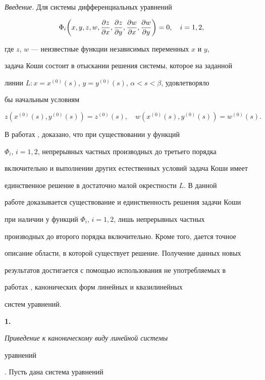 \label{begin} 


 


{\it Введение.} Для системы дифференциальных уравнений 


$$ 


\Phi_i\bigg(x,y,z,w,\myfrac{z}{x}, 


\myfrac{z}{y},\myfrac{w}{x},\myfrac{w}{y} \bigg)=0,\quad i=1,2, 


$$ 


где $z$, $w$ --- неизвестные функции независимых переменных $x$ и $y$, 


задача Коши состоит в отыскании решения системы, которое на заданной 


линии $L:x=x^{(0)}(s)$, $y=y^{(0)}(s)$, $\alpha<s<\beta$, удовлетворяло 


бы начальным условиям 


$$ 


z(x^{(0)}(s),y^{(0)}(s))=z^{(0)}(s),\quad 


w(x^{(0)}(s),y^{(0)}(s))=w^{(0)}(s). 


$$ 


В работах \cite{1}, \cite{2} доказано, что при существовании у функций 


$\Phi_i$, $i=1,2$, непрерывных частных производных до третьего порядка 


включительно и выполнении других естественных условий задача Коши имеет 


единственное решение в достаточно малой окрестности $L$. В данной 


работе доказывается существование и единственность решения задачи Коши 


при наличии у функций $\Phi_i$, $i=1,2$, лишь непрерывных частных 


производных до второго порядка включительно. Кроме того, дается точное 


описание области, в которой существует решение. Получение данных новых 


результатов достигается с помощью использования не употребляемых в 


работах \cite{1}, \cite{2} канонических форм линейных и квазилинейных 


систем уравнений. 


\medskip 


 


{\bf 1.} {\it Приведение к каноническому виду линейной системы 


уравнений}. Пусть дана система уравнений 



